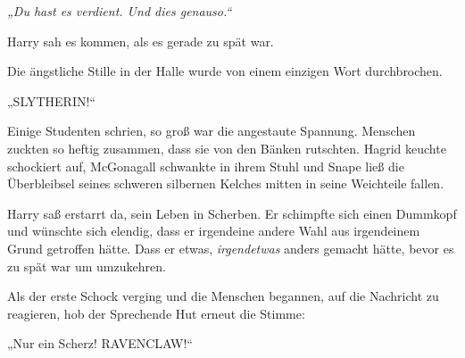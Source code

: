 \emph{„Du hast es verdient. Und dies genauso.“} 

Harry sah es kommen, als es gerade zu spät war. 

Die ängstliche Stille in der Halle wurde von einem einzigen Wort durchbrochen. 

„SLYTHERIN!“ 

Einige Studenten schrien, so groß war die angestaute Spannung. Menschen zuckten so heftig zusammen, dass sie von den Bänken rutschten. Hagrid keuchte schockiert auf, McGonagall schwankte in ihrem Stuhl und Snape ließ die Überbleibsel seines schweren silbernen Kelches mitten in seine Weichteile fallen. 

Harry saß erstarrt da, sein Leben in Scherben. Er schimpfte sich einen Dummkopf und wünschte sich elendig, dass er irgendeine andere Wahl aus irgendeinem Grund getroffen hätte. Dass er etwas, \emph{irgendetwas} anders gemacht hätte, bevor es zu spät war um umzukehren. 

Als der erste Schock verging und die Menschen begannen, auf die Nachricht zu reagieren, hob der Sprechende Hut erneut die Stimme: 

„Nur ein Scherz! RAVENCLAW!“
